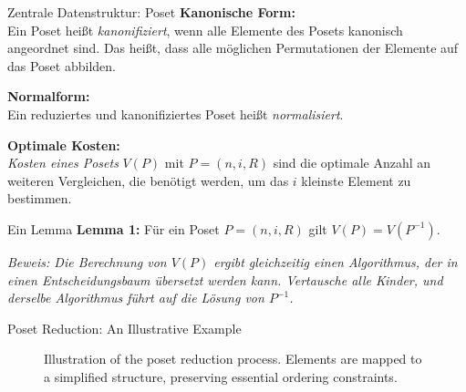 \begin{frame}{Zentrale Datenstruktur: Poset}
  \textbf{Kanonische Form:} \\
  \vspace{1mm}
  Ein Poset heißt \textit{kanonifiziert}, wenn alle Elemente des Posets kanonisch angeordnet sind. Das heißt, dass alle möglichen Permutationen der Elemente auf das Poset abbilden.

  \pause
  \vspace{2mm}
  \textbf{Normalform:} \\
  \vspace{1mm}
  Ein reduziertes und kanonifiziertes Poset heißt \textit{normalisiert}.

  \pause
  \vspace{2mm}
  \textbf{Optimale Kosten:} \\
  \vspace{1mm}
  \textit{Kosten eines Posets} $V(P)$ mit $P=(n,i,R)$ sind die optimale Anzahl an weiteren Vergleichen, die benötigt werden, um das $i$ kleinste Element zu bestimmen.
\end{frame}

\begin{frame}{Ein Lemma}
  \textbf{Lemma 1:} Für ein Poset $P=(n,i,R)$ gilt $V(P) = V(P^{-1})$.
  \vspace{1mm}

  \textit{Beweis: Die Berechnung von $V(P)$ ergibt gleichzeitig einen Algorithmus, der in einen Entscheidungsbaum übersetzt werden kann. Vertausche alle Kinder, und derselbe Algorithmus führt auf die Lösung von $P^{-1}$.}

\end{frame}

\begin{frame}{Poset Reduction: An Illustrative Example}
  \begin{figure}
    
    \caption{Illustration of the poset reduction process. Elements are mapped to a simplified structure, preserving essential ordering constraints.}
  \end{figure}
\end{frame}

